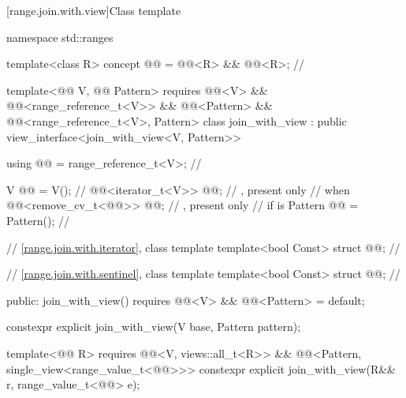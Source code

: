 [range.join.with.view]{Class template }

%
\begin{codeblock}
namespace std::ranges {
  template<class R>
  concept @@ = @@<R> && @@<R>;    // \expos

  template<@@ V, @@ Pattern>
    requires @@<V> && @@<range_reference_t<V>>
          && @@<Pattern>
          && @@<range_reference_t<V>, Pattern>
  class join_with_view : public view_interface<join_with_view<V, Pattern>> {
    using @@ = range_reference_t<V>;                  // \expos

    V @@ = V();                                          // \expos
    @@<iterator_t<V>> @@;         // \expos, present only
                                                            // when 
    @@<remove_cv_t<@@>> @@;   // \expos, present only
                                                            // if  is 
    Pattern @@ = Pattern();                           // \expos

    // \ref{range.join.with.iterator}, class template 
    template<bool Const> struct @@;                   // \expos

    // \ref{range.join.with.sentinel}, class template 
    template<bool Const> struct @@;                   // \expos

  public:
    join_with_view()
      requires @@<V> && @@<Pattern> = default;

    constexpr explicit join_with_view(V base, Pattern pattern);

    template<@@ R>
      requires @@<V, views::all_t<R>> &&
               @@<Pattern, single_view<range_value_t<@@>>>
    constexpr explicit join_with_view(R&& r, range_value_t<@@> e);

}}
\end{codeblock}

